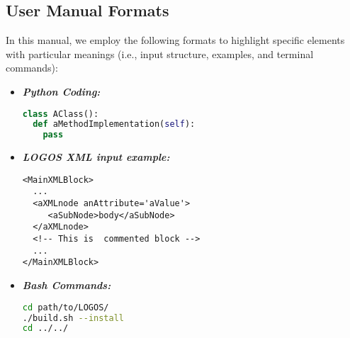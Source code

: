 \subsection{User Manual Formats}
In this manual, we employ the following formats to highlight specific elements with
particular meanings (i.e., input structure, examples, and terminal commands):

\begin{itemize}
\item \textbf{\textit{Python Coding:}}
\begin{lstlisting}[language=python]
class AClass():
  def aMethodImplementation(self):
    pass
\end{lstlisting}
\item \textbf{\textit{LOGOS XML input example:}}
\begin{lstlisting}[style=XML,morekeywords={anAttribute}]
<MainXMLBlock>
  ...
  <aXMLnode anAttribute='aValue'>
     <aSubNode>body</aSubNode>
  </aXMLnode>
  <!-- This is  commented block -->
  ...
</MainXMLBlock>
\end{lstlisting}
\item \textbf{\textit{Bash Commands:}}
\begin{lstlisting}[language=bash]
cd path/to/LOGOS/
./build.sh --install
cd ../../
\end{lstlisting}
\end{itemize}

